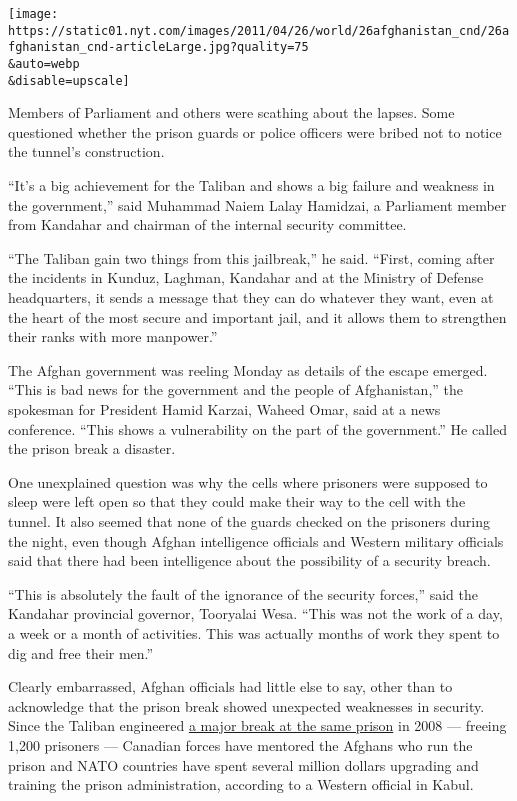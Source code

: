 \texttt{[image: https://static01.nyt.com/images/2011/04/26/world/26afghanistan\_cnd/26afghanistan\_cnd-articleLarge.jpg?quality=75\\\&auto=webp\\\&disable=upscale]}

Members of Parliament and others were scathing about the lapses. Some
questioned whether the prison guards or police officers were bribed not
to notice the tunnel's construction.

``It's a big achievement for the Taliban and shows a big failure and
weakness in the government,'' said Muhammad Naiem Lalay Hamidzai, a
Parliament member from Kandahar and chairman of the internal security
committee.

``The Taliban gain two things from this jailbreak,'' he said. ``First,
coming after the incidents in Kunduz, Laghman, Kandahar and at the
Ministry of Defense headquarters, it sends a message that they can do
whatever they want, even at the heart of the most secure and important
jail, and it allows them to strengthen their ranks with more manpower.''

The Afghan government was reeling Monday as details of the escape
emerged. ``This is bad news for the government and the people of
Afghanistan,'' the spokesman for President Hamid Karzai, Waheed Omar,
said at a news conference. ``This shows a vulnerability on the part of
the government.'' He called the prison break a disaster.

One unexplained question was why the cells where prisoners were supposed
to sleep were left open so that they could make their way to the cell
with the tunnel. It also seemed that none of the guards checked on the
prisoners during the night, even though Afghan intelligence officials
and Western military officials said that there had been intelligence
about the possibility of a security breach.

``This is absolutely the fault of the ignorance of the security
forces,'' said the Kandahar provincial governor, Tooryalai Wesa. ``This
was not the work of a day, a week or a month of activities. This was
actually months of work they spent to dig and free their men.''

Clearly embarrassed, Afghan officials had little else to say, other than
to acknowledge that the prison break showed unexpected weaknesses in
security. Since the Taliban engineered
\href{http://www.nytimes.com/2008/06/14/world/asia/14kandahar.html}{a
major break at the same prison} in 2008 --- freeing 1,200 prisoners ---
Canadian forces have mentored the Afghans who run the prison and NATO
countries have spent several million dollars upgrading and training the
prison administration, according to a Western official in Kabul.

